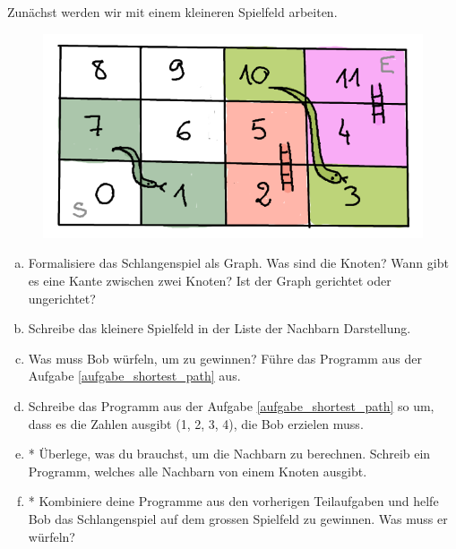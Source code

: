 \begin{aufgabe}\label{aufgabe_schlangenspiel}
Zunächst werden wir mit einem kleineren Spielfeld arbeiten.
\begin{figure}[H]
    \centering
    \includegraphics[width=\textwidth]{Pictures/SP/schlangen_spiel.png}
\end{figure}
\begin{enumerate}[(a)]
    \item Formalisiere das Schlangenspiel als Graph. Was sind die Knoten? Wann gibt es eine Kante zwischen zwei Knoten? Ist der Graph gerichtet oder ungerichtet?
    \item Schreibe das kleinere Spielfeld in der Liste der Nachbarn Darstellung.
    \item Was muss Bob würfeln, um zu gewinnen? Führe das Programm aus der Aufgabe \ref{aufgabe_shortest_path} aus.
    \item Schreibe das Programm aus der Aufgabe \ref{aufgabe_shortest_path} so um, dass es die Zahlen ausgibt (1, 2, 3, 4), die Bob erzielen muss.
    \item * Überlege, was du brauchst, um die Nachbarn zu berechnen. Schreib ein Programm, welches alle Nachbarn von einem Knoten ausgibt.
    \item * Kombiniere deine Programme aus den vorherigen Teilaufgaben und helfe Bob das Schlangenspiel auf dem grossen Spielfeld zu gewinnen. Was muss er würfeln?
\end{enumerate}{}
\end{aufgabe}
